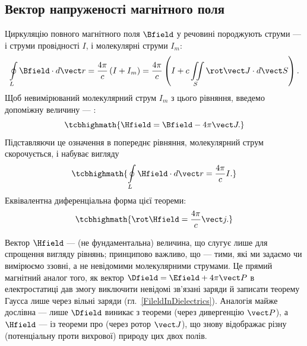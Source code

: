 \subsection*{Вектор напруженості магнітного поля}

Циркуляцію повного магнітного поля $\Bfield$ у речовині породжують  струми --- і струми провідності $I$, і молекулярні струми $I_m$:
\begin{equation*}
	\oint\limits_L \Bfield\cdot d\vect r = \frac{4\pi}c\left(I + I_m\right) = \frac{4\pi}c\left(I + c\iint\limits_S \rot\vect J\cdot d\vect
	S\right).
\end{equation*}
Щоб  невимірюваний молекулярний струм $I_m$ з цього рівняння, введемо допоміжну величину --- :
\begin{equation}\label{eq:HDef}
	\tcbhighmath{
		\Hfield = \Bfield - 4\pi\vect J.
	}
\end{equation}
Підставляючи це означення в попереднє рівняння, молекулярний струм скорочується, і  набуває вигляду
\begin{equation}\label{eq:CirculationHInt}
	\tcbhighmath{
		\oint\limits_L \Hfield\cdot d\vect r = \frac{4\pi}c I.
	}
\end{equation}
Еквівалентна диференціальна форма цієї теореми:
\begin{equation}\label{eq:CirculationHDiff}
	\tcbhighmath{
		\rot\Hfield = \frac{4\pi}c\vect j.
	}
\end{equation}

\begin{Attention}
	Вектор $\Hfield$ ---  (не фундаментальна) величина, що слугує лише для спрощення вигляду рівнянь; принципово важливо, що
	 --- тими, які ми задаємо чи вимірюємо ззовні, а не невідомими молекулярними
	струмами. Це прямий магнітний аналог того, як вектор $\Dfield = \Efield + 4\pi\vect P$ в електростатиці дав змогу виключити невідомі зв'язані
	заряди й записати теорему Гаусса лише через вільні заряди (гл.~\ref{FileldInDielectrics}). Аналогія майже дослівна --- лише $\Dfield$ виникає з
	теореми  (через дивергенцію $\vect P$), а $\Hfield$ --- із теореми про  (через ротор $\vect J$), що знову
	відображає різну (потенціальну проти вихрової) природу цих двох полів.
\end{Attention}

